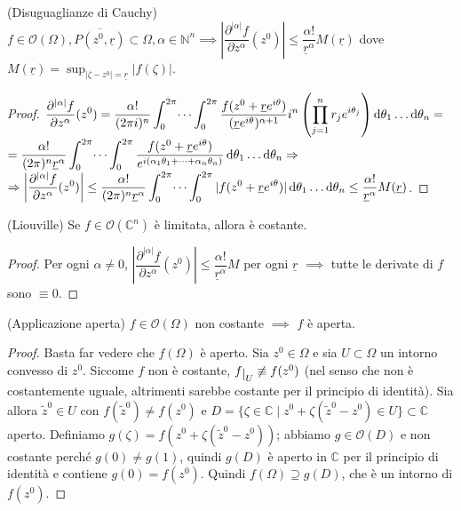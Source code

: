 \begin{prop}
  (Disuguaglianze di Cauchy) $f \in \mathcal{O}(\Omega), \overline{P(z^0, \underline{r})} \subset \Omega, \alpha \in \mathbb{N}^n \implies \left|\dfrac{\partial^{|\alpha|} f}{\partial z^\alpha}(z^0)\right| \le \dfrac{\alpha!}{\underline{r}^\alpha}M(\underline{r})$ dove $\displaystyle M(\underline{r})=\sup_{|\zeta-z^0|=\underline{r}} |f(\zeta)|$.
\end{prop}

\begin{proof}
  $\displaystyle \dfrac{\partial^{|\alpha|} f}{\partial z^\alpha}(z^0)=\dfrac{\alpha!}{(2\pi i)^n} \int_0^{2\pi} \dots \int_0^{2\pi} \frac{f(z^0+\underline{r}e^{i\theta})}{(\underline{r}e^{i\theta})^{\alpha+1}}i^n\left(\prod_{j=1}^n r_je^{i\theta_j}\right)\mathop{}\!\mathrm{d}\theta_1\dots\mathop{}\!\mathrm{d}\theta_n=$\\
  $\displaystyle =\frac{\alpha!}{(2\pi)^n\underline{r}^\alpha}\int_0^{2\pi} \dots \int_0^{2\pi} \frac{f(z^0+\underline{r}e^{i\theta})}{e^{i(\alpha_1\theta_1+\dots+\alpha_n\theta_n)}}\mathop{}\!\mathrm{d}\theta_1\dots\mathop{}\!\mathrm{d}\theta_n \Rightarrow$ \\
  $\displaystyle \Rightarrow \left|\dfrac{\partial^{|\alpha|} f}{\partial z^\alpha}(z^0)\right| \le \frac{\alpha!}{(2\pi)^n\underline{r}^\alpha}\int_0^{2\pi} \dots \int_0^{2\pi} |f(z^0+\underline{r}e^{i\theta})|\mathop{}\!\mathrm{d}\theta_1\dots\mathop{}\!\mathrm{d}\theta_n \le \dfrac{\alpha!}{\underline{r}^\alpha}M(\underline{r})$.
\end{proof}

\begin{cor}
  (Liouville) Se $f \in \mathcal{O}(\mathbb{C}^n)$ è limitata, allora è costante.
\end{cor}

\begin{proof}
  Per ogni $\alpha \not=0$, $\left|\dfrac{\partial^{|\alpha|} f}{\partial z^\alpha}(z^0)\right| \le \dfrac{\alpha!}{\underline{r}^\alpha}M$ per ogni $\underline{r}$ $\implies$ tutte le derivate di $f$ sono $\equiv 0$.
\end{proof}

\begin{thm}
  (Applicazione aperta) $f \in \mathcal{O}(\Omega)$ non costante $\implies$ $f$ è aperta.
\end{thm}

\begin{proof}
  Basta far vedere che $f(\Omega)$ è aperto. Sia $z^0 \in \Omega$ e sia $U \subset \Omega$ un intorno convesso di $z^0$. Siccome $f$ non è costante, $f\restrict{U} \not\equiv f(z^0)$ (nel senso che non è costantemente uguale, altrimenti sarebbe costante per il principio di identità).
  Sia allora $\tilde{z}^0 \in U$ con $f(\tilde{z}^0)\not=f(z^0)$ e $D=\{\zeta \in \mathbb{C} \mid z^0+\zeta(\tilde{z}^0-z^0) \in U\} \subset \mathbb{C}$ aperto.
  Definiamo $g(\zeta)=f(z^0+\zeta(\tilde{z}^0-z^0))$; abbiamo $g \in \mathcal{O}(D)$ e non costante perché $g(0)\not=g(1)$, quindi $g(D)$ è aperto in $\mathbb{C}$ per il principio di identità e contiene $g(0)=f(z^0)$. Quindi $f(\Omega) \supseteq g(D)$, che è un intorno di $f(z^0)$.
\end{proof}

